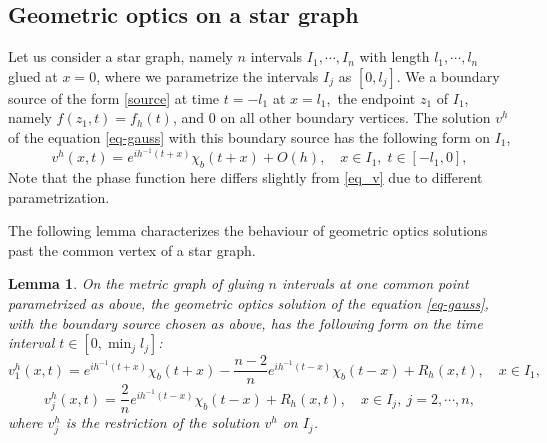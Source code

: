\documentclass[11pt]{amsart}
\theoremstyle{definition}
\theoremstyle{plain}
\newtheorem{lemma}[definition]{Lemma}
\numberwithin{equation}{section}
\begin{document}
\subsection{Geometric optics on a star graph}
Let us consider a star graph, namely $n$ intervals $I_1,\cdots,I_n$ with length $l_1,\cdots,l_n$ glued at $x=0$, where we parametrize the intervals $I_j$ as $[0,l_j]$.
We a boundary source of the form \eqref{source} at time $t=-l_1$ at $x=l_1,$ the endpoint $z_1$ of $I_1$, namely $f(z_1,t)=f_h(t)$, and $0$ on all other boundary vertices. 
The solution $v^h$ of the equation \eqref{eq-gauss} with this boundary source has the following form on $I_1$,
\begin{equation}\label{v_h}
    v^h(x,t)=e^{ih^{-1}(t+x)}\chi_b(t+x) +O(h), \quad x\in I_1,\; t\in [-l_1,0],
\end{equation}
Note that the phase function here differs slightly from \eqref{eq_v} due to different parametrization.


The following lemma characterizes the behaviour of geometric optics solutions past the common vertex of a star graph.

\begin{lemma} \label{CGO-Y}
On the metric graph of gluing $n$ intervals at one common point parametrized as above, the geometric optics solution of the equation \eqref{eq-gauss}, with the boundary source chosen as above, has the following form on the time interval $t\in [0,\min_{j} l_j]$:
\begin{equation}
    v_1^h(x,t)= e^{ih^{-1}(t+x)}\chi_b(t+x) - \frac{n-2}{n} e^{ih^{-1}(t-x)}\chi_b(t-x) +R_h(x,t), \quad x\in I_1, 
\end{equation}
\begin{equation}
    v_j^h(x,t)= \frac{2}{n} e^{ih^{-1}(t-x)}\chi_b(t-x) +R_h(x,t), \quad x\in I_j,\  j=2,\cdots, n,
\end{equation}
where $v_j^h$ is the restriction of the solution $v^h$ on $I_j$.
\end{lemma}
\end{document}
